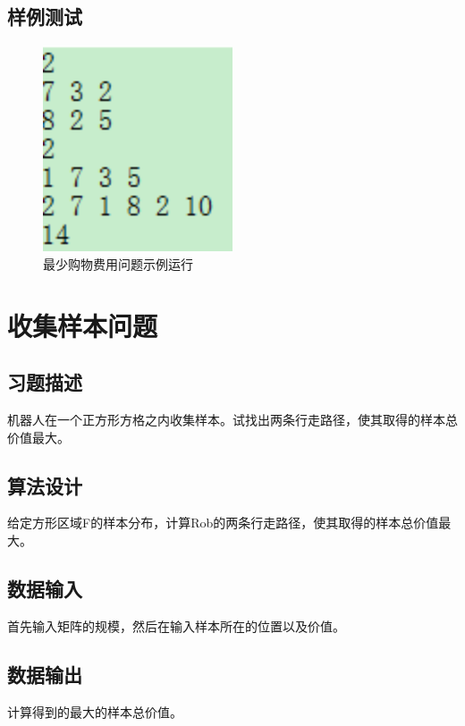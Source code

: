 \documentclass[UTF8]{ctexart}
\begin{document}
    \subsection{样例测试}
    \begin{figure}[!htb]
      \centering
      \includegraphics[width=0.5\textwidth]{../img/3.PNG}
      \caption{最少购物费用问题示例运行}\label{最少购物费问题示例运行}
    \end{figure}

    \section{收集样本问题}
    \subsection{习题描述}
    机器人在一个正方形方格之内收集样本。试找出两条行走路径，使其取得的样本总价值最大。

    \subsection{算法设计}
    给定方形区域F的样本分布，计算Rob的两条行走路径，使其取得的样本总价值最大。

    \subsection{数据输入}
    首先输入矩阵的规模，然后在输入样本所在的位置以及价值。

    \subsection{数据输出}
    计算得到的最大的样本总价值。
\end{document}
